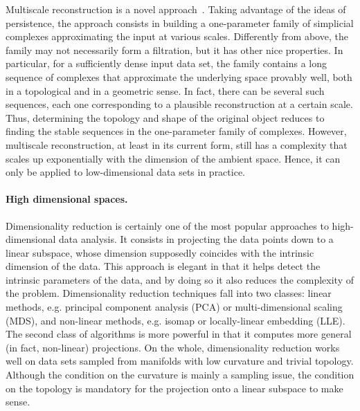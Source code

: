 Multiscale reconstruction is a novel approach~\cite{geometrica-bgo-09}. Taking advantage of the ideas of persistence, the approach consists in building a one-parameter family of simplicial complexes approximating the input at various scales. Differently from above, the family may not necessarily form a filtration, but it has other nice properties. In particular, for a sufficiently dense input data set, the family contains a long sequence of complexes that approximate the underlying space provably well, both in a topological and in a geometric sense. In fact, there can be several such sequences, each one corresponding to a plausible reconstruction at a certain scale. Thus, determining the topology and shape of the original object reduces to finding the stable sequences in the one-parameter family of complexes.   However, multiscale reconstruction, at least in its current form, still has a complexity that scales up exponentially with the dimension of the ambient space. Hence, it can only be applied to low-dimensional data sets in practice.


\paragraph{High dimensional spaces.}
Dimensionality reduction is certainly one of the most popular approaches to high-dimensional data analysis. It consists in projecting the data points down to a linear subspace, whose dimension supposedly coincides with the intrinsic dimension of the data. This approach is elegant in that it helps detect the intrinsic parameters of the data, and by doing so it also reduces the complexity of the problem. Dimensionality reduction techniques fall into two classes: linear methods, e.g. principal component analysis (PCA) or multi-dimensional scaling (MDS), and non-linear methods, e.g. isomap or locally-linear embedding (LLE). The second class of algorithms is more powerful in that it computes more general (in fact, non-linear) projections. On the whole, dimensionality reduction works well on data sets sampled from manifolds with low curvature and trivial topology. Although the condition on the curvature is mainly a sampling issue, the condition on the topology is mandatory for the projection onto a linear subspace to make sense.


